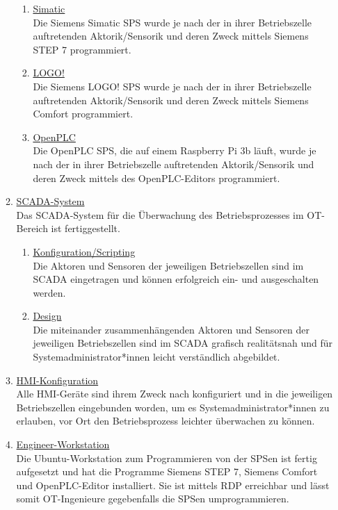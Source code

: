 \documentclass[
	headings=optiontotocandhead,%
	oneside,
	numbers=noenddot,%
	toc=flat, %
	10pt, %
	parskip=full, %
	listof=totoc, %
	listof=flat, %
	numbers=noenddot, %
	bibliography=totoc, %
	a4paper,DIV=14,
]{scrartcl}
\begin{document}
\begin{enumerate}[start=1,label={\bfseries Ziel-H \arabic*},leftmargin=*,wide]
\begin{enumerate}[label=\alph*.]
\begin{enumerate}[label=\roman*.]
\item{\underline{Simatic}}\\
Die Siemens Simatic SPS wurde je nach der in ihrer Betriebszelle auftretenden Aktorik/Sensorik und deren Zweck mittels Siemens STEP 7 programmiert.

\item{\underline{LOGO!}}\\
Die Siemens LOGO! SPS wurde je nach der in ihrer Betriebszelle auftretenden Aktorik/Sensorik und deren Zweck mittels Siemens Comfort programmiert.

\item{\underline{OpenPLC}}\\
Die OpenPLC SPS, die auf einem Raspberry Pi 3b läuft, wurde je nach der in ihrer Betriebszelle auftretenden Aktorik/Sensorik und deren Zweck mittels des OpenPLC-Editors programmiert.
\end{enumerate}

\item{\underline{SCADA-System}}\\
Das SCADA-System für die Überwachung des Betriebsprozesses im OT-Bereich ist fertiggestellt.

\begin{enumerate}[label=\roman*.]
\item{\underline{Konfiguration/Scripting}}\\
Die Aktoren und Sensoren der jeweiligen Betriebszellen sind im SCADA eingetragen und können erfolgreich ein- und ausgeschalten werden.

\item{\underline{Design}}\\
Die miteinander zusammenhängenden Aktoren und Sensoren der jeweiligen Betriebszellen sind im SCADA grafisch realitätsnah und für Systemadministrator*innen leicht verständlich abgebildet.
\end{enumerate}

\item{\underline{HMI-Konfiguration}}\\
Alle HMI-Geräte sind ihrem Zweck nach konfiguriert und in die jeweiligen Betriebszellen eingebunden worden, um es Systemadministrator*innen zu erlauben, vor Ort den Betriebsprozess leichter überwachen zu können.

\item{\underline{Engineer-Workstation}}\\
Die Ubuntu-Workstation zum Programmieren von der SPSen ist fertig aufgesetzt und hat die Programme Siemens STEP 7, Siemens Comfort und OpenPLC-Editor installiert. Sie ist mittels RDP erreichbar und lässt somit OT-Ingenieure gegebenfalls die SPSen umprogrammieren.


\end{enumerate}
\end{enumerate}
\end{document}
